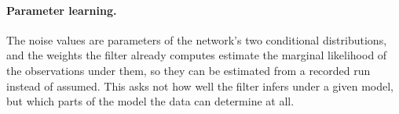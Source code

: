 \paragraph{Parameter learning.} The noise values are parameters of the network's two conditional distributions,
and the weights the filter already computes estimate the marginal likelihood of the observations under them,
so they can be estimated from a recorded run instead of assumed. This asks not how well
the filter infers under a given model, but which parts of the model the data can determine at all.
